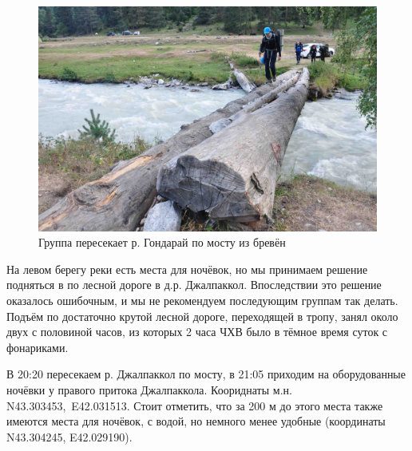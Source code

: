 \begin{figure}[h]
	\centering
	\includegraphics[width=0.7\linewidth]{../pics/DSC_1167}
	\caption{Группа пересекает р. Гондарай по мосту из бревён}
	\label{fig:hondaray}
\end{figure}

На левом берегу реки есть места для ночёвок, но мы принимаем решение подняться в по лесной дороге в д.р. Джалпаккол. Впоследствии это решение оказалось ошибочным, и мы не рекомендуем последующим группам так делать. Подъём по достаточно крутой лесной дороге, переходящей в тропу, занял около двух с половиной часов, из которых 2 часа ЧХВ было в тёмное время суток с фонариками.

В 20:20 пересекаем р. Джалпаккол по мосту, в 21:05 приходим на оборудованные ночёвки у правого притока Джалпаккола. Коориднаты м.н. N43.303453\degree,~E42.031513\degree. Стоит отметить, что за 200 м до этого места также имеются места для ночёвок, с водой, но немного менее удобные (координаты N43.304245\degree, E42.029190\degree).



\clearpage